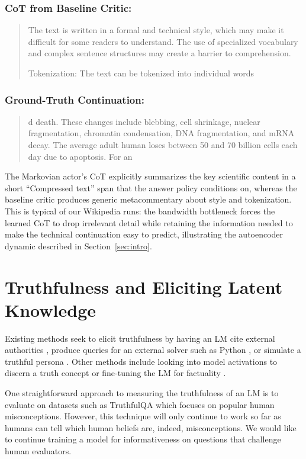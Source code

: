 \documentclass{article} %
\begin{document}
\subsubsection{CoT from Baseline Critic:}
\begin{quote}
The text is written in a formal and technical style, which may make it difficult for some readers to understand. The use of specialized vocabulary and complex sentence structures may create a barrier to comprehension.

Tokenization: The text can be tokenized into individual words
\end{quote}

\subsubsection{Ground-Truth Continuation:}
\begin{quote}
d death. These changes include blebbing, cell shrinkage, nuclear fragmentation, chromatin condensation, DNA fragmentation, and mRNA decay. The average adult human loses between 50 and 70 billion cells each day due to apoptosis. For an
\end{quote}

The Markovian actor's CoT explicitly summarizes the key scientific content in a short ``Compressed text'' span that the answer policy conditions on, whereas the baseline critic produces generic metacommentary about style and tokenization. This is typical of our Wikipedia runs: the bandwidth bottleneck forces the learned CoT to drop irrelevant detail while retaining the information needed to make the technical continuation easy to predict, illustrating the autoencoder dynamic described in Section~\ref{sec:intro}.

\section{Truthfulness and Eliciting Latent Knowledge}
\label{app:truth}

Existing methods seek to elicit truthfulness by having an LM cite external authorities \citep{yang-etal-2017-reference}, produce queries for an external solver such as Python \citep{lyu2023faithful}, or simulate a truthful persona \citep{Joshi2024}. Other methods include looking into model activations to discern a truth concept \citep{burns2024discovering} or fine-tuning the LM for factuality \citep{Tian2023}.

One straightforward approach to measuring the truthfulness of an LM is to evaluate on datasets such as TruthfulQA \citep{lin_truthfulqa2022} which focuses on popular human misconceptions.
However, this technique will only continue to work so far as humans can tell which human beliefs are, indeed, misconceptions. 
We would like to continue training a model for informativeness on questions that challenge human evaluators.
\end{document}
